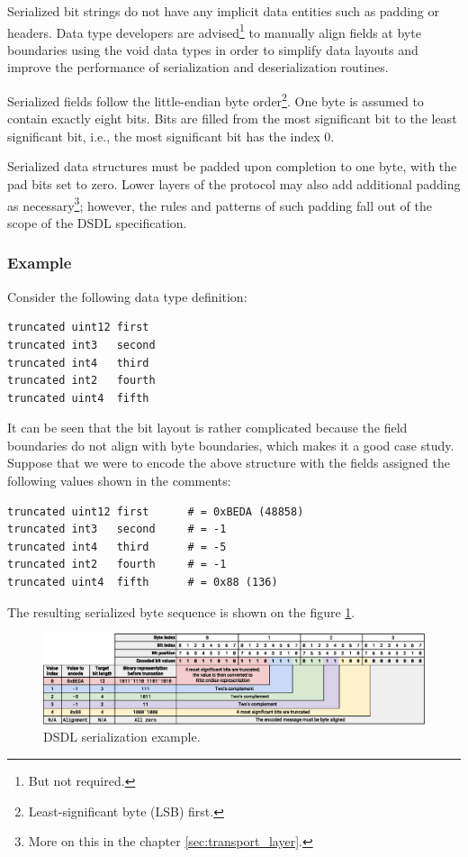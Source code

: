 Serialized bit strings do not have any implicit data entities such as padding or headers.
Data type developers are advised\footnote{But not required.} to manually align fields at
byte boundaries using the void data types
in order to simplify data layouts and improve the performance of serialization and deserialization routines.

Serialized fields follow the little-endian byte order\footnote{Least-significant byte (LSB) first.}.
One byte is assumed to contain exactly eight bits.
Bits are filled from the most significant bit to the least significant bit,
i.e., the most significant bit has the index 0.

Serialized data structures must be padded upon completion to one byte,
with the pad bits set to zero.
Lower layers of the protocol may also add additional padding as
necessary\footnote{More on this in the chapter \ref{sec:transport_layer}.};
however, the rules and patterns of such padding fall out of the scope of the DSDL specification.

\subsubsection{Example}

Consider the following data type definition:

\begin{verbatim}
truncated uint12 first
truncated int3   second
truncated int4   third
truncated int2   fourth
truncated uint4  fifth
\end{verbatim}

It can be seen that the bit layout is rather complicated because the field boundaries do not align with byte
boundaries, which makes it a good case study.
Suppose that we were to encode the above structure with the fields assigned the following values
shown in the comments:

\begin{verbatim}
truncated uint12 first      # = 0xBEDA (48858)
truncated int3   second     # = -1
truncated int4   third      # = -5
truncated int2   fourth     # = -1
truncated uint4  fifth      # = 0x88 (136)
\end{verbatim}

The resulting serialized byte sequence is shown on the figure \ref{fig:dsdl_serialization_example}.

\begin{figure}[H]
    \centering
	\includegraphics[width=\textwidth]{dsdl/bit-encoding}
	\caption{DSDL serialization example.\label{fig:dsdl_serialization_example}}
\end{figure}

